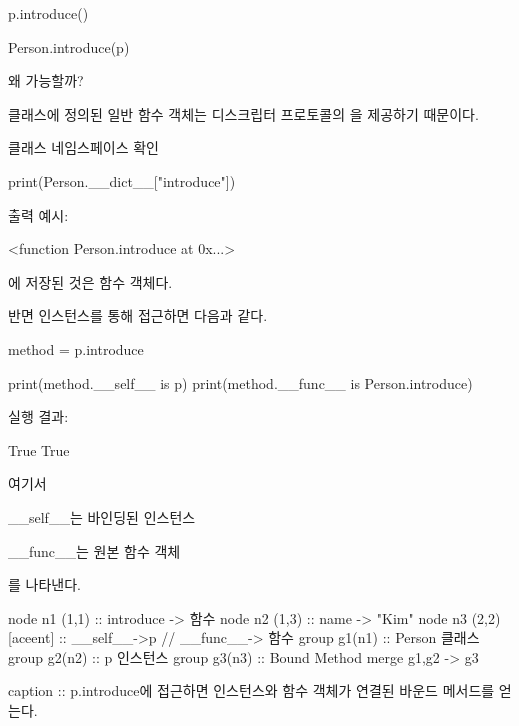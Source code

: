 \begin{dhkcode}
p.introduce()

Person.introduce(p)
\end{dhkcode}

왜 가능할까?

클래스에 정의된 일반 함수 객체는 디스크립터 프로토콜의 을 제공하기 때문이다.

\begin{dhknote}
\begin{dhksmry}[centered]
클래스 네임스페이스 확인
\end{dhksmry}
\end{dhknote}

\begin{dhkcode}
print(Person.__dict__["introduce"])
\end{dhkcode}

출력 예시:

\begin{dhkzsh}
<function Person.introduce at 0x...>
\end{dhkzsh}

에 저장된 것은 함수 객체다.

반면 인스턴스를 통해 접근하면 다음과 같다.

\begin{dhkcode}
method = p.introduce

print(method.__self__ is p)
print(method.__func__ is Person.introduce)
\end{dhkcode}

실행 결과:

\begin{dhkzsh}
True
True
\end{dhkzsh}

여기서

\begin{dhksmry}
    __self__는 바인딩된 인스턴스

    __func__는 원본 함수 객체
\end{dhksmry}

를 나타낸다.

\begin{dhkgraph}[uniform]
node n1 (1,1) :: introduce -> 함수
node n2 (1,3) :: name -> "Kim"
node n3 (2,2) [aceent] :: __self__->p // __func__-> 함수
group g1(n1) :: Person 클래스
group g2(n2) :: p 인스턴스
group g3(n3) :: Bound Method 
merge g1,g2 -> g3

caption :: p.introduce에 접근하면 인스턴스와 함수 객체가 연결된 바운드 메서드를 얻는다.
\end{dhkgraph}

